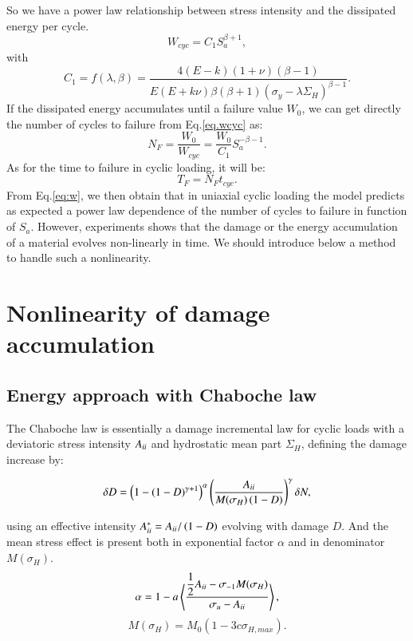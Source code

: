 \documentclass[3p,times,number,review]{elsarticle}
\begin{document}
So we have a power law relationship between stress intensity and the dissipated energy per cycle.
\begin{equation}
W_{cyc}=C_1S_{a}^{\beta+1},
\label{eq.wcyc}
\end{equation}
with 
$$C_1=f(\lambda,\beta)=\dfrac{4(E-k)(1+\nu)\left( \beta-1\right) }{ E(E+k\nu)\beta\left( \beta+1\right)\left(\sigma_y-\lambda \Sigma_H\right)^{\beta-1} }.$$
If the dissipated energy accumulates until a failure value $W_0$, we can get directly the number of cycles to failure from Eq.\eqref{eq.wcyc} as:
\begin{equation}
N_{F}=\dfrac{W_0}{W_{cyc}}=\dfrac{W_0}{C_1}S_{a}^{-\beta-1}.
\label{eq.NFcyc}
\end{equation}
As for the time to failure in cyclic loading, it will be:
$$T_{F}=N_{F}t_{cyc}.$$
From Eq.\eqref{eq:w}, we then obtain that in uniaxial cyclic loading the model predicts as expected a power law dependence of the number of cycles to failure in function of $S_{a}$.
However, experiments shows that the damage or the energy accumulation of a material evolves non-linearly in time. We should introduce below a method to handle such a nonlinearity.

\section{Nonlinearity of damage accumulation}
\label{sec:5.6}
\subsection{Energy approach with Chaboche law}
The Chaboche law\cite{lemaitre1990mechanics} is essentially a damage incremental law for cyclic loads with a deviatoric stress intensity ${A}_{\uppercase\expandafter{\romannumeral2}}$ and hydrostatic mean part $\Sigma_H$, defining the damage increase by:

\begin{equation}\delta D = \left( 1 -(1-D)^{\gamma+1}\right)^\alpha \left(\frac{{A}_{\uppercase\expandafter{\romannumeral2}} }{M(\sigma_H)\left( 1-D\right)}\right)^\gamma \delta N ,
\label{chabochemulti}
\end{equation} 

using an effective intensity ${A}_{\uppercase\expandafter{\romannumeral2}}^*={A}_{\uppercase\expandafter{\romannumeral2}}/\left( 1-D\right) $ evolving with damage $D$. And the mean stress effect is present both in exponential factor $\alpha$ and in denominator $M(\sigma_H)$.
$$\alpha=1 - a\left\langle \dfrac{\dfrac{1}{2}{A}_{\uppercase\expandafter{\romannumeral2}}-\sigma_{-1}M(\sigma_H) }{\sigma_{u} -{A}_{\uppercase\expandafter{\romannumeral2}}}\right\rangle,$$
$$M(\sigma_H) =M_0 \left(1-3c\sigma_{H,max}\right).$$
\end{document}
